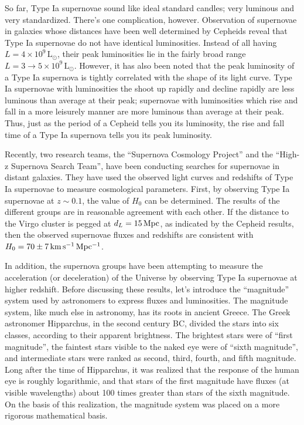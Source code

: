 \documentclass[a4paper,11pt]{article}
\begin{document}
{\noindent}So far, Type Ia supernovae sound like ideal standard candles; very luminous and very standardized. There’s one complication, however. Observation of supernovae in galaxies whose distances have been well determined by Cepheids reveal that Type Ia supernovae do not have identical luminosities. Instead of all having $L = 4\times10^9\,\mathrm{L}_\odot$, their peak luminosities lie in the fairly broad range $L = 3\rightarrow5\times10^9\,\mathrm{L}_\odot$. However, it has also been noted that the peak luminosity of a Type Ia supernova is tightly correlated with the shape of its light curve. Type Ia supernovae with luminosities the shoot up rapidly and decline rapidly are less luminous than average at their peak; supernovae with luminosities which rise and fall in a more leisurely manner are more luminous than average at their peak. Thus, just as the period of a Cepheid tells you its luminosity, the rise and fall time of a Type Ia supernova tells you its peak luminosity.

{\noindent}Recently, two research teams, the ``Supernova Cosmology Project'' and the ``High-z Supernova Search Team'', have been conducting searches for supernovae in distant galaxies. They have used the observed light curves and redshifts of Type Ia supernovae to measure cosmological parameters. First, by observing Type Ia supernovae at $z\sim0.1$, the value of $H_0$ can be determined. The results of the different groups are in reasonable agreement with each other. If the distance to the Virgo cluster is pegged at $d_L = 15\,{\rm Mpc}$, as indicated by the Cepheid results, then the observed supernovae fluxes and redshifts are consistent with $H_0 = 70\pm7\,{\rm km\,s^{-1}\,Mpc^{-1}}$.

{\noindent}In addition, the supernova groups have been attempting to measure the acceleration (or deceleration) of the Universe by observing Type Ia supernovae at higher redshift. Before discussing these results, let's introduce the ``magnitude'' system used by astronomers to express fluxes and luminosities. The magnitude system, like much else in astronomy, has its roots in ancient Greece. The Greek astronomer Hipparchus, in the second century BC, divided the stars into six classes, according to their apparent brightness. The brightest stars were of ``first magnitude'', the faintest stars visible to the naked eye were of ``sixth magnitude'', and intermediate stars were ranked as second, third, fourth, and fifth magnitude. Long after the time of Hipparchus, it was realized that the response of the human eye is roughly logarithmic, and that stars of the first magnitude have fluxes (at visible wavelengths) about 100 times greater than stars of the sixth magnitude. On the basis of this realization, the magnitude system was placed on a more rigorous mathematical basis.
\end{document}
